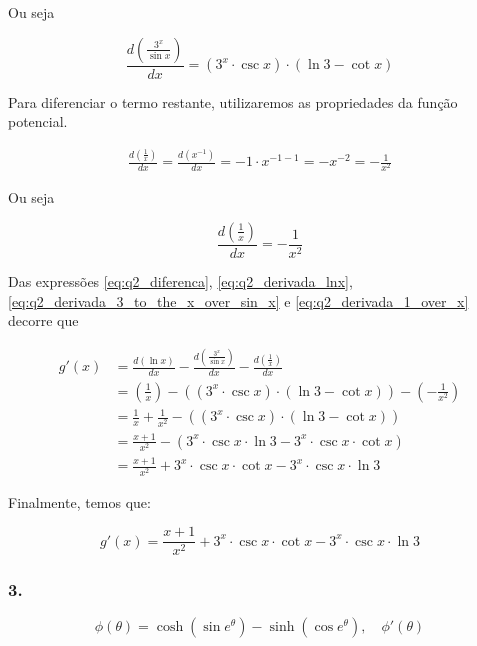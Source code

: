 \documentclass{article}
\begin{document}
Ou seja

\begin{equation}\label{eq:q2_derivada_3_to_the_x_over_sin_x}
    \frac{d (\frac{3^x}{\sin x})}{dx} = (3^x \cdot \csc x) \cdot (\ln 3 - \cot x)
\end{equation}

Para diferenciar o termo restante, utilizaremos as propriedades da função potencial.

\begin{align*}
    \frac{d(\frac{1}{x})}{dx}
    = \frac{d(x^{-1})}{dx}
    = -1 \cdot x^{-1 - 1}
    = -x^{-2}
    = -\frac{1}{x^2}
\end{align*}

Ou seja

\begin{equation}\label{eq:q2_derivada_1_over_x}
    \frac{d (\frac{1}{x})}{dx} = -\frac{1}{x^2}
\end{equation}

Das expressões
\ref{eq:q2_diferenca},
\ref{eq:q2_derivada_lnx},
\ref{eq:q2_derivada_3_to_the_x_over_sin_x} e
\ref{eq:q2_derivada_1_over_x}
decorre que

\begin{align*}
    g'(x)
     & =
    \frac{d (\ln x)}{dx}
    - \frac{d (\frac{3^x}{\sin x})}{dx}
    - \frac{d(\frac{1}{x})}{dx}
    \\
     & =
    \left(\frac{1}{x}\right)
    - ((3^x \cdot \csc x) \cdot (\ln 3 - \cot x))
    - \left(-\frac{1}{x^2}\right)
    \\
     & =
    \frac{1}{x}
    + \frac{1}{x^2}
    - ((3^x \cdot \csc x) \cdot (\ln 3 - \cot x))
    \\
     & =
    \frac{x + 1}{x^2}
    - (3^x \cdot \csc x  \cdot \ln 3
    - 3^x \cdot \csc x \cdot \cot x)
    \\
     & =
    \frac{x + 1}{x^2}
    + 3^x \cdot \csc x \cdot \cot x
    - 3^x \cdot \csc x  \cdot \ln 3
\end{align*}

Finalmente, temos que:

\[
    g'(x) =
    \frac{x + 1}{x^2}
    + 3^x \cdot \csc x \cdot \cot x - 3^x \cdot \csc x  \cdot \ln 3
\]


\subsubsection*{3.}

\[
    \phi(\theta) = \cosh(\sin e^{\theta}) - \sinh(\cos e^{\theta}), \quad \phi'(\theta)
\]
\end{document}
